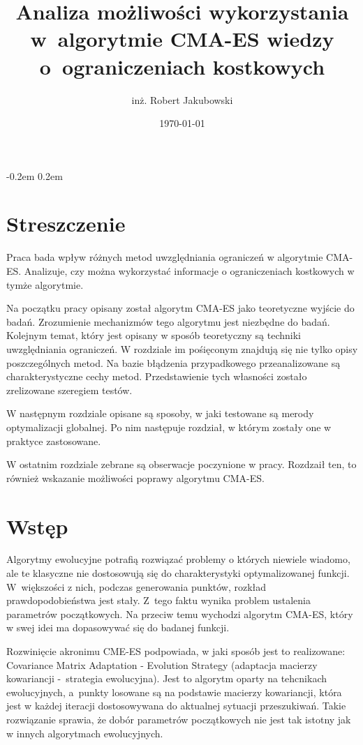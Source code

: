 \documentclass{mini}
\title{Analiza możliwości wykorzystania w~algorytmie CMA-ES wiedzy o~ograniczeniach kostkowych}
\author{inż. Robert Jakubowski}
\date{\today}
\begin{document}
\maketitle

\pagebreak
\thispagestyle{empty}

\openup -0.2em %
\tableofcontents
\openup 0.2em %

\thispagestyle{empty}
\raggedbottom
\pagebreak


\section{Streszczenie}

Praca bada wpływ różnych metod uwzględniania ograniczeń w algorytmie CMA-ES. Analizuje, czy można wykorzystać informacje o ograniczeniach kostkowych w tymże algorytmie.

Na początku pracy opisany został algorytm CMA-ES jako teoretyczne wyjście do badań. Zrozumienie mechanizmów tego algorytmu jest niezbędne do badań. Kolejnym temat, który jest opisany w sposób teoretyczny są techniki uwzględniania ograniczeń. W rozdziale im pośięconym znajdują się nie tylko opisy poszczególnych metod. Na bazie błądzenia przypadkowego przeanalizowane są charakterystyczne cechy metod. Przedstawienie tych własności zostało zrelizowane szeregiem testów.

W następnym rozdziale opisane są sposoby, w jaki testowane są merody optymalizacji globalnej. Po nim następuje rozdział, w którym zostały one w praktyce zastosowane.

W ostatnim rozdziale zebrane są obserwacje poczynione w pracy. Rozdzaił ten, to również wskazanie możliwości poprawy algorytmu CMA-ES.

\pagebreak

\section{Wstęp}
Algorytmy ewolucyjne potrafią rozwiązać problemy o których niewiele wiadomo, ale te klasyczne nie dostosowują się do charakterystyki optymalizowanej funkcji. W~większości z nich, podczas generowania punktów, rozkład prawdopodobieństwa jest stały. Z~tego faktu wynika problem ustalenia parametrów początkowych. Na przeciw temu wychodzi algorytm CMA-ES, który w swej idei ma dopasowywać się do badanej funkcji.

Rozwinięcie akronimu CME-ES podpowiada, w jaki sposób jest to realizowane: Covariance Matrix Adaptation - Evolution Strategy (adaptacja macierzy kowariancji -~strategia ewolucyjna). Jest to algorytm oparty na tehcnikach ewolucyjnych, a~punkty losowane są na podstawie macierzy kowariancji, która jest w każdej iteracji dostosowywana do aktualnej sytuacji przeszukiwań. Takie rozwiązanie sprawia, że dobór parametrów początkowych nie jest tak istotny jak w innych algorytmach ewolucyjnych.
\end{document}
